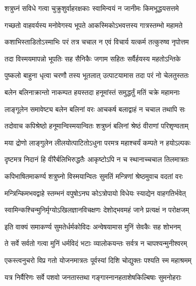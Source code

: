 \twolineshloka
{शत्रुघ्नं सविधे गत्वा चुक्रुशुर्वाहरक्षकाः}
{स्वामिन्वयं न जानीमः किमभूद्धयसत्तमे}%

\twolineshloka
{गच्छतो वाहवर्यस्य मनोवेगस्य भूपते}
{आकस्मिकोऽभवत्तस्य गात्रस्तम्भो महामते}%

\twolineshloka
{कशाभिस्ताडितोऽस्माभिः परं तत्र चचाल न}
{एवं विचार्य यत्कर्म तत्कुरुष्व नृपोत्तम}%

\twolineshloka
{तदा विस्मयमापन्नो भूपतिः सह सैनिकैः}
{जगाम सहितः सर्वैर्हयस्य महतोऽन्तिके}%

\twolineshloka
{पुष्कलो बाहुना धृत्वा चरणौ तस्य भूतलात्}
{उत्पाटयामास तदा परं नो चेलतुस्ततः}%

\twolineshloka
{बलेन बलिनाक्रान्तो नाकम्पत हयस्तदा}
{हनूमांस्तं समुद्धर्तुं मतिं चक्रे महामनाः}%

\twolineshloka
{लाङ्गूलेन समावेष्ट्य बलेन बलिनां वरः}
{आचकर्ष बलाद्वाहं न चचाल तथापि सः}%

\twolineshloka
{तदोवाच कपिश्रेष्ठो हनूमान्विस्मयान्वितः}
{शत्रुघ्नं बलिनां श्रेष्ठं वीराणां परिशृण्वताम्}%

\twolineshloka
{मया द्रोणो लाङ्गुलेन लीलयोत्पाटितोऽधुना}
{परमत्र महाश्चर्यं कम्पते न हयोऽल्पकः}%

\twolineshloka
{दृष्टमत्र निदानं हि वीरैर्बलिभिरुद्धतैः}
{आकृष्टोऽपि न च स्थानाच्चचाल तिलमात्रतः}%

\twolineshloka
{कपिभाषितमाकर्ण्य शत्रुघ्नो विस्मयान्वितः}
{सुमतिं मन्त्रिणां श्रेष्ठमुवाच वदतां वरः}%


\twolineshloka
{मन्त्रिन्किमभवद्वाहे स्तम्भनं वपुषोऽनघ}
{कोऽत्रोपायो विधेयः स्याद्येन वाहगतिर्भवेत्}%


\twolineshloka
{स्वामिन्कश्चिन्मुनिर्मृग्योऽखिलज्ञानविचक्षणः}
{देशोद्भवमहं जाने प्रत्यक्षं न परोक्षजम्}%


\twolineshloka
{इति वाक्यं समाकर्ण्य सुमतेर्धर्मकोविदः}
{अन्वेषयामास मुनिं सेवकैः सह शोभनम्}%

\twolineshloka
{ते सर्वे सर्वतो गत्वा मुनिं धर्मविदं भटाः}
{व्यालोकयन्तः सर्वत्र न चापश्यन्मुनीश्वरम्}%

\twolineshloka
{एकस्त्वनुचरो विप्र गतो योजनमात्रतः}
{पूर्वस्यां दिशि चोद्युक्तः पश्यति स्म महाश्रमम्}%

\twolineshloka
{यत्र निर्वैरिणः सर्वे पशवो जनतास्तथा}
{गङ्गास्नानहताशेषकिल्बिषाः सुमनोहराः}%

